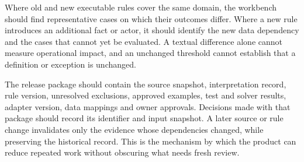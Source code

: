 Where old and new executable rules cover the same domain, the workbench should
find representative cases on which their outcomes differ. Where a new rule
introduces an additional fact or actor, it should identify the new data dependency
and the cases that cannot yet be evaluated. A textual difference alone cannot
measure operational impact, and an unchanged threshold cannot establish that a
definition or exception is unchanged.

The release package should contain the source snapshot, interpretation record,
rule version, unresolved exclusions, approved examples, test and solver results,
adapter version, data mappings and owner approvals. Decisions made with that
package should record its identifier and input snapshot. A later source or rule
change invalidates only the evidence whose dependencies changed, while preserving
the historical record. This is the mechanism by which the product can reduce
repeated work without obscuring what needs fresh review.
